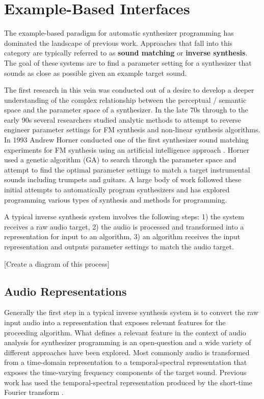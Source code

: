 \section{Example-Based Interfaces}
The example-based paradigm for automatic synthesizer programming has dominated the landscape of previous work. Approaches that fall into this category are typically referred to as \textbf{sound matching} or \textbf{inverse synthesis}. The goal of these systems are to find a parameter setting for a synthesizer that sounds as close as possible given an example target sound. 

The first research in this vein was conducted out of a desire to develop a deeper understanding of the complex relationship between the perceptual / semantic space and the parameter space of a synthesizer. In the late 70s through to the early 90s several researchers studied analytic methods to attempt to reverse engineer parameter settings for FM synthesis \cite{justice1979analytic, beauchamp1982synthesis, payne1987microcomputer} and non-linear synthesis \cite{delprat1990parameter} algorithms. In 1993 Andrew Horner conducted one of the first synthesizer sound matching experiments for FM synthesis using an artificial intelligence approach \cite{horner1993machine}. Horner used a genetic algorithm (GA) to search through the parameter space and attempt to find the optimal parameter settings to match a target instrumental sounds including trumpets and guitars. A large body of work followed these initial attempts to automatically program synthesizers and has explored programming various types of synthesis and methods for programming.

A typical inverse synthesis system involves the following steps: 1) the system receives a raw audio target, 2) the audio is processed and transformed into a representation for input to an algorithm, 3) an algorithm receives the input representation and outputs parameter settings to match the audio target.

[Create a diagram of this process]

\subsection{Audio Representations}
Generally the first step in a typical inverse synthesis system is to convert the raw input audio into a representation that exposes relevant features for the proceeding algorithm. What defines a relevant feature in the context of audio analysis for synthesizer programming is an open-question and a wide variety of different approaches have been explored. Most commonly audio is transformed from a time-domain representation to a temporal-spectral representation that exposes the time-varying frequency components of the target sound. Previous work has used the temporal-spectral representation produced by the short-time Fourier transform \cite{horner1995wavetable, horner1995envelope, horner1996piecewise, chinen2007genesynth, yee2007evolving, barkan2019inversynth}. 

